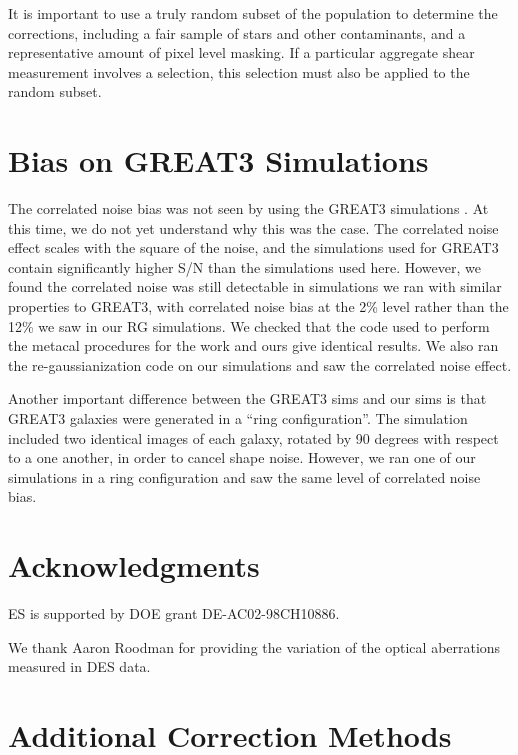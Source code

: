 \documentclass[usegraphicx,usenatbib]{mn2e}
\begin{document}
It is important to use a truly random subset of the population to determine the
corrections, including a fair sample of stars and other contaminants, and a
representative amount of pixel level masking.  If a particular aggregate shear
measurement involves a selection, this selection must also be applied to the
random subset.

\section{Bias on GREAT3 Simulations}

The correlated noise bias was not seen by \cite{HuffMcal} using the GREAT3
simulations \citep{great3}.  At this time, we do not yet understand why this
was the case.  The correlated noise effect scales with the square of the noise,
and the simulations used for GREAT3 contain significantly higher S/N than
the simulations used here.  However, we found the correlated noise was still
detectable in simulations we ran with similar properties to GREAT3, with
correlated noise bias at the 2\% level rather than the 12\% we saw in our RG
simulations.  We checked that the code used to perform the metacal procedures
for the \cite{HuffMcal} work and ours give identical results.  We also ran the
re-gaussianization code on our simulations and saw the correlated noise
effect.

Another important difference between the GREAT3 sims and our sims is that
GREAT3 galaxies were generated in a ``ring configuration''.  The simulation
included two identical images of each galaxy, rotated by 90 degrees with
respect to a one another, in order to cancel shape noise.  However, we ran one
of our simulations in a ring configuration and saw the same level of correlated
noise bias.

\section*{Acknowledgments}

ES is supported by DOE grant DE-AC02-98CH10886.

We thank Aaron Roodman for providing the variation of the optical aberrations
measured in DES data.



\appendix

\section{Additional Correction Methods}
\end{document}
